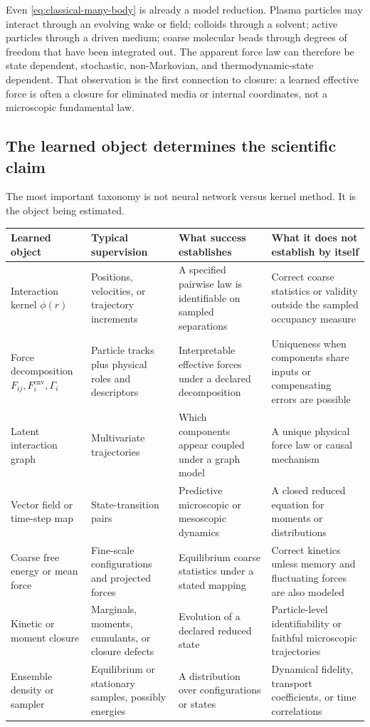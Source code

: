 Even \cref{eq:classical-many-body} is already a model reduction. Plasma particles may interact through an evolving wake or field; colloids through a solvent; active particles through a driven medium; coarse molecular beads through degrees of freedom that have been integrated out. The apparent force law can therefore be state dependent, stochastic, non-Markovian, and thermodynamic-state dependent. That observation is the first connection to closure: a learned effective force is often a closure for eliminated media or internal coordinates, not a microscopic fundamental law.

\subsection{The learned object determines the scientific claim}

The most important taxonomy is not neural network versus kernel method. It is the object being estimated.

\begin{center}
\begin{tabularx}{\textwidth}{@{}P{0.16\textwidth}P{0.19\textwidth}P{0.19\textwidth}Y@{}}
\toprule
\textbf{Learned object} & \textbf{Typical supervision} & \textbf{What success establishes} & \textbf{What it does not establish by itself} \\
\midrule
Interaction kernel \(\phi(r)\) & Positions, velocities, or trajectory increments & A specified pairwise law is identifiable on sampled separations & Correct coarse statistics or validity outside the sampled occupancy measure \\
Force decomposition \(F_{ij},F_i^{\mathrm{env}},\Gamma_i\) & Particle tracks plus physical roles and descriptors & Interpretable effective forces under a declared decomposition & Uniqueness when components share inputs or compensating errors are possible \\
Latent interaction graph & Multivariate trajectories & Which components appear coupled under a graph model & A unique physical force law or causal mechanism \\
Vector field or time-step map & State-transition pairs & Predictive microscopic or mesoscopic dynamics & A closed reduced equation for moments or distributions \\
Coarse free energy or mean force & Fine-scale configurations and projected forces & Equilibrium coarse statistics under a stated mapping & Correct kinetics unless memory and fluctuating forces are also modeled \\
Kinetic or moment closure & Marginals, moments, cumulants, or closure defects & Evolution of a declared reduced state & Particle-level identifiability or faithful microscopic trajectories \\
Ensemble density or sampler & Equilibrium or stationary samples, possibly energies & A distribution over configurations or states & Dynamical fidelity, transport coefficients, or time correlations \\
\bottomrule
\end{tabularx}
\end{center}

